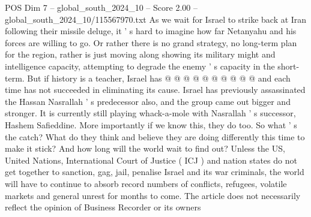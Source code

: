 \begin{textsample}{POS Dim 7 – global\_south\_2024\_10 – Score 2.00 – global\_south\_2024\_10/115567970.txt}
As we wait for Israel to strike back at Iran following their missile deluge, it ' s hard to imagine how far Netanyahu and his forces are willing to go.
Or rather there is no grand strategy, no long-term plan for the region, rather is just moving along showing its military might and intelligence capacity, attempting to degrade the enemy ' s capacity in the short-term.
But if history is a teacher, Israel has @ @ @ @ @ @ @ @ @ @ and each time has not succeeded in eliminating its cause.
Israel has previously assassinated the Hassan Nasrallah ' s predecessor also, and the group came out bigger and stronger.
It is currently still playing whack-a-mole with Nasrallah ' s successor, Hashem Safieddine.
More importantly if we know this, they do too.
So what ' s the catch?
What do they think and believe they are doing differently this time to make it stick?
And how long will the world wait to find out?
Unless the US, United Nations, International Court of Justice ( ICJ ) and nation states do not get together to sanction, gag, jail, penalise Israel and its war criminals, the world will have to continue to absorb record numbers of conflicts, refugees, volatile markets and general unrest for months to come.
The article does not necessarily reflect the opinion of Business Recorder or its owners

\end{textsample}
